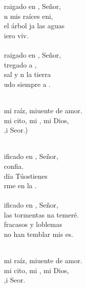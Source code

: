 \begin{cancion}[Tú, mi raíz][Ixcís]%
	raigado en , Señor,\\
	n mis raíces eni,\\
	 el árbol ja las aguas\\
	iero viv.\\
\jump\\
	raigado en , Señor,\\
	tregado a ,\\
	 sal y n la tierra\\
	udo siempre a .\\\jump\\
	\begin{chorus}%
	 mi raíz, miuente de amor. \\
	 mi cito, mi , mi Dios, \\
	,i Seor.) \\
	\end{chorus}%
	\jump\\
	ificado en , Señor,\\
	 confia. \\
	 día Túostienes \\
	rme en la .\\
\jump\\
	ificado en , Señor,\\
	 las tormentas na temeré.\\
	fracasos y loblemas\\
	no han temblar mis es. \\\jump\\
	\begin{chorus}%
	 mi raíz, miuente de amor. \\
	 mi cito, mi , mi Dios, \\
	,i Seor.   \\
	\end{chorus}%
	\jump\\
\end{cancion}%
